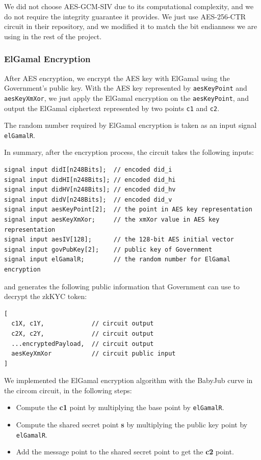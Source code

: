 \documentclass[
]{report}
\providecommand{\tightlist}{%
  \setlength{\itemsep}{0pt}\setlength{\parskip}{0pt}}
\begin{document}
We did not choose AES-GCM-SIV due to its computational complexity, and
we do not require the integrity guarantee it provides. We just use
AES-256-CTR circuit in their repository, and we modified it to match the
bit endianness we are using in the rest of the project.

\subsubsection{ElGamal Encryption}

After AES encryption, we encrypt the AES key with ElGamal using the
Government's public key. With the AES key represented by
\texttt{aesKeyPoint} and \texttt{aesKeyXmXor}, we just apply the ElGamal
encryption on the \texttt{aesKeyPoint}, and output the ElGamal
ciphertext represented by two points \texttt{c1} and \texttt{c2}.

The random number required by ElGamal encryption is taken as an input
signal \texttt{elGamalR}.

In summary, after the encryption process, the circuit takes the
following inputs:

\begin{verbatim}
signal input didI[n248Bits];  // encoded did_i
signal input didHI[n248Bits]; // encoded did_hi
signal input didHV[n248Bits]; // encoded did_hv
signal input didV[n248Bits];  // encoded did_v
signal input aesKeyPoint[2];  // the point in AES key representation
signal input aesKeyXmXor;     // the xmXor value in AES key representation
signal input aesIV[128];      // the 128-bit AES initial vector
signal input govPubKey[2];    // public key of Government
signal input elGamalR;        // the random number for ElGamal encryption
\end{verbatim}

and generates the following public information that Government can use
to decrypt the zkKYC token:

\begin{verbatim}
[
  c1X, c1Y,             // circuit output
  c2X, c2Y,             // circuit output
  ...encryptedPayload,  // circuit output
  aesKeyXmXor           // circuit public input
]
\end{verbatim}

We implemented the ElGamal encryption algorithm with the BabyJub curve
in the circom circuit, in the following steps:
\begin{itemize}
  \tightlist
  \item Compute the \textbf{c1} point by multiplying the base point by
    \texttt{elGamalR}.
  \item Compute the shared secret point \textbf{s} by multiplying the
    public key point by \texttt{elGamalR}.
  \item Add the message point to the shared secret point to get the
    \textbf{c2} point.
\end{itemize}
\end{document}
